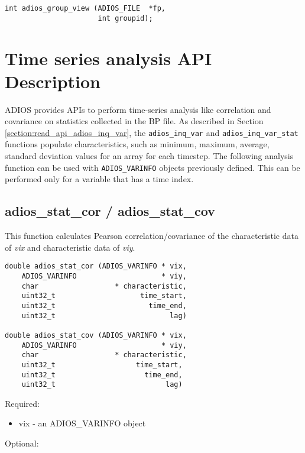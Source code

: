 \begin{lstlisting}[alsolanguage=C]
int adios_group_view (ADIOS_FILE  *fp, 
                      int groupid);
\end{lstlisting}


\section{Time series analysis API Description}

ADIOS provides APIs to perform time-series analysis like correlation and covariance 
on statistics collected in the BP file. As described in 
Section \ref{section:read_api_adios_inq_var}, the \verb+adios_inq_var+ and 
\verb+adios_inq_var_stat+ functions
populate characteristics, such as minimum, maximum, average, standard deviation 
values for an array for each timestep. The following analysis function can be used 
with \verb+ADIOS_VARINFO+ objects previously defined. This can be performed only for 
a variable that has a time index.

\subsection{adios\_stat\_cor / adios\_stat\_cov}

This function calculates Pearson correlation/covariance of the characteristic data 
of \textit{vix} and characteristic data of \textit{viy}.

\begin{lstlisting}[]
double adios_stat_cor (ADIOS_VARINFO * vix, 
    ADIOS_VARINFO                    * viy, 
    char                  * characteristic, 
    uint32_t                    time_start, 
    uint32_t                      time_end, 
    uint32_t                           lag)

double adios_stat_cov (ADIOS_VARINFO * vix, 
    ADIOS_VARINFO                    * viy, 
    char                  * characteristic, 
    uint32_t                   time_start, 
    uint32_t                     time_end, 
    uint32_t                          lag)
\end{lstlisting}

Required:

\begin{itemize}
\item vix - an ADIOS\_VARINFO object
\end{itemize}

Optional:

